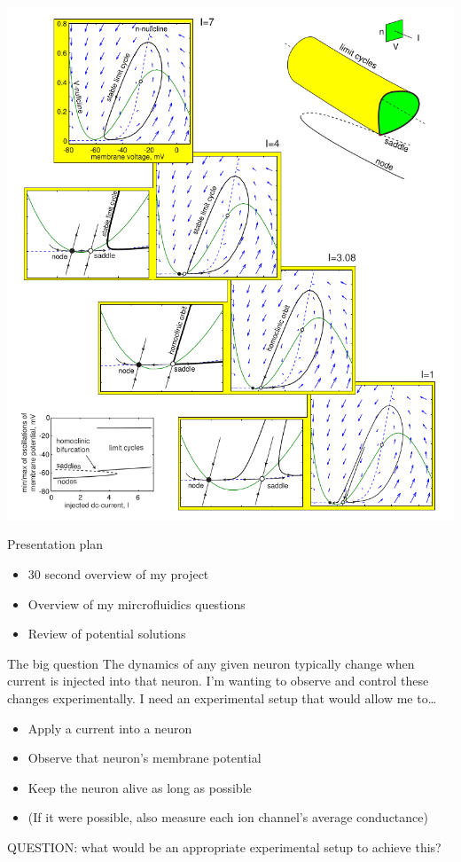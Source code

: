 \documentclass[aspectratio=169]{beamer}
\begin{document}
\begin{frame}[plain]

\begin{center}
\includegraphics[height=1.4\textheight]{./homoclinic.png}
\end{center}
\end{frame}

\begin{frame}[label={sec:org9b4670d}]{Presentation plan}
\begin{itemize}
\item 30 second overview of my project
\item \alert{Overview of my mircrofluidics questions}
\item Review of potential solutions
\end{itemize}
\end{frame}
\begin{frame}[label={sec:orgdac3cf6}]{The big question}
The dynamics of any given neuron typically change when current is injected into that neuron. I'm wanting to observe and control these changes experimentally.
I need an experimental setup that would allow me to\ldots{}
\begin{itemize}[<+->]
\item Apply a current into a neuron
\item Observe that neuron's membrane potential
\item Keep the neuron alive as long as possible
\item (If it were possible, also measure each ion channel's average conductance)
\end{itemize}

QUESTION: what would be an appropriate experimental setup to achieve this?
\end{frame}
\end{document}
